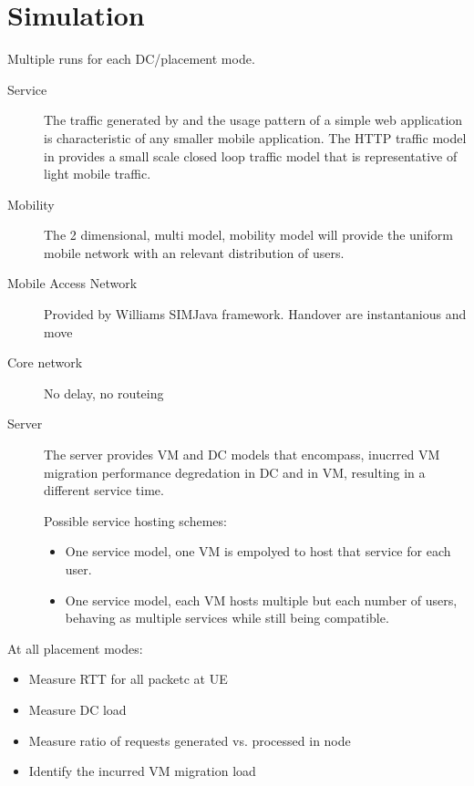 \section{Simulation}


Multiple runs for each DC/\xcloud placement mode.
\begin{description}
\item[Service]
The traffic generated by and the usage pattern of a simple web application is characteristic of any smaller mobile application. The HTTP traffic model in \cite{liu2001traffic} provides a small scale closed loop traffic model that is representative of light mobile traffic.

\item[Mobility]
The 2 dimensional, multi model, mobility model \cite{bettstetter2001smooth} will provide the uniform mobile network with an relevant distribution of users.

\item[Mobile Access Network] Provided by Williams SIMJava framework. Handover are instantanious and move 

\item[Core network] No delay, no routeing

\item[Server] The server provides VM and DC models that encompass, inucrred VM migration performance degredation in DC and in VM, resulting in a different service time.

Possible service hosting schemes:
\begin{itemize}
\item One service model, one VM is empolyed to host that service for each user.
\item One service model, each VM hosts multiple but each number of users, behaving as multiple services while still being compatible.
\end{itemize}

\end{description}

At all placement modes:
\begin{itemize}
\item Measure RTT for all packetc at UE
\item Measure DC load
\item Measure ratio of requests generated vs. processed in \xcloud node
\item Identify the incurred VM migration load
\end{itemize}